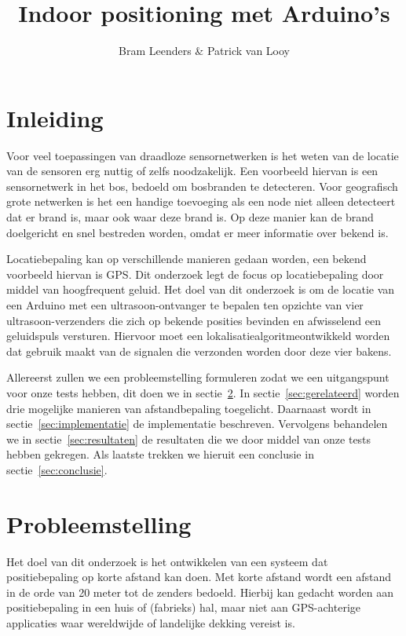 \documentclass[a4paper,10pt]{article}
\title{Indoor positioning met Arduino's}
\author{Bram Leenders \& Patrick van Looy}
\begin{document}
\maketitle

\section{Inleiding}
Voor veel toepassingen van draadloze sensornetwerken is het weten van de locatie van de sensoren erg nuttig of zelfs noodzakelijk. Een voorbeeld hiervan is een sensornetwerk in het bos, bedoeld om bosbranden te detecteren. Voor geografisch grote netwerken is het een handige toevoeging als een node niet alleen detecteert dat er brand is, maar ook waar deze brand is. Op deze manier kan de brand doelgericht en snel bestreden worden, omdat er meer informatie over bekend is.

Locatiebepaling kan op verschillende manieren gedaan worden, een bekend voorbeeld hiervan is GPS. Dit onderzoek legt de focus op locatiebepaling door middel van hoogfrequent geluid. Het doel van dit onderzoek is om de locatie van een Arduino met een ultrasoon-ontvanger te bepalen ten opzichte van vier ultrasoon-verzenders die zich op bekende posities bevinden en afwisselend een geluidspuls versturen. Hiervoor moet een lokalisatiealgoritmeontwikkeld worden dat gebruik maakt van de signalen die verzonden worden door deze vier bakens.

Allereerst zullen we een probleemstelling formuleren zodat we een uitgangspunt voor onze tests hebben, dit doen we in sectie~\ref{sec:probleemstelling}. In sectie~\ref{sec:gerelateerd} worden drie mogelijke manieren van afstandbepaling toegelicht. Daarnaast wordt in sectie~\ref{sec:implementatie} de implementatie beschreven. Vervolgens behandelen we in sectie~\ref{sec:resultaten} de resultaten die we door middel van onze tests hebben gekregen. Als laatste trekken we hieruit een conclusie in sectie~\ref{sec:conclusie}.

\section{Probleemstelling}\label{sec:probleemstelling}
Het doel van dit onderzoek is het ontwikkelen van een systeem dat positiebepaling op korte afstand kan doen. Met korte afstand wordt een afstand in de orde van 20 meter tot de zenders bedoeld. Hierbij kan gedacht worden aan positiebepaling in een huis of (fabrieks) hal, maar niet aan GPS-achterige applicaties waar wereldwijde of landelijke dekking vereist is.
\end{document}
